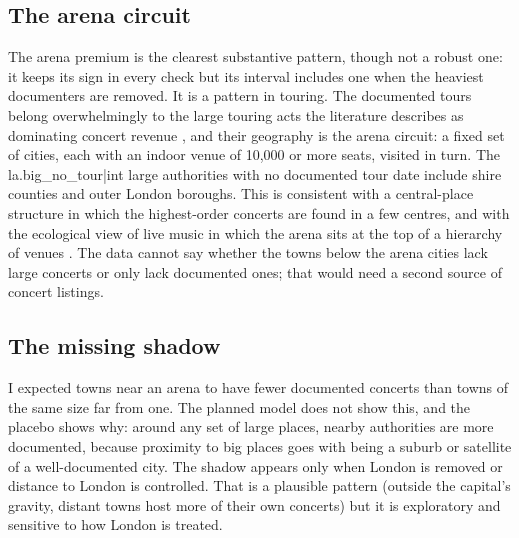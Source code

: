 \documentclass[11pt,a4paper]{article}
\begin{document}
\subsection{The arena circuit}
The arena premium is the clearest substantive pattern, though not a robust one: it keeps its sign in every check but its interval includes one when the heaviest documenters are removed. It is a pattern in touring. The documented tours belong overwhelmingly to the large touring acts the literature describes as dominating concert revenue \citep{krueger2005,connolly2006}, and their geography is the arena circuit: a fixed set of cities, each with an indoor venue of 10,000 or more seats, visited in turn. The {{la.big_no_tour|int}} large authorities with no documented tour date include shire counties and outer London boroughs. This is consistent with a central-place structure in which the highest-order concerts are found in a few centres, and with the ecological view of live music in which the arena sits at the top of a hierarchy of venues \citep{behr2016}. The data cannot say whether the towns below the arena cities lack large concerts or only lack documented ones; that would need a second source of concert listings.

\subsection{The missing shadow}
I expected towns near an arena to have fewer documented concerts than towns of the same size far from one. The planned model does not show this, and the placebo shows why: around any set of large places, nearby authorities are more documented, because proximity to big places goes with being a suburb or satellite of a well-documented city. The shadow appears only when London is removed or distance to London is controlled. That is a plausible pattern (outside the capital's gravity, distant towns host more of their own concerts) but it is exploratory and sensitive to how London is treated.
\end{document}
